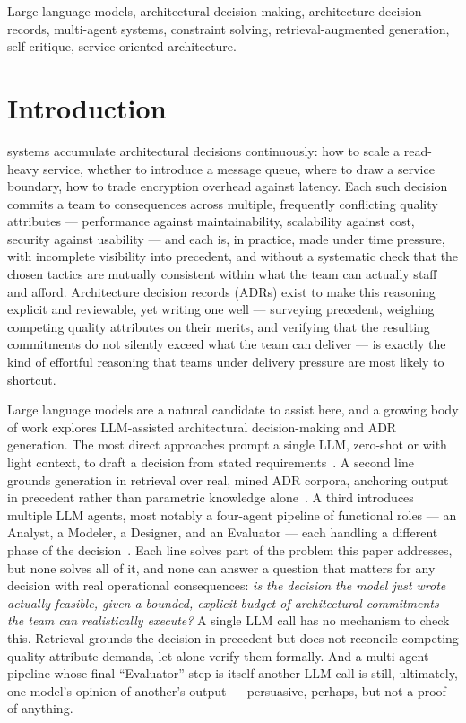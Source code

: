 \documentclass[lettersize,journal]{IEEEtran}
\begin{document}
\begin{abstract}
\end{abstract}

\begin{IEEEkeywords}
Large language models, architectural decision-making, architecture decision records, multi-agent systems, constraint solving, retrieval-augmented generation, self-critique, service-oriented architecture.
\end{IEEEkeywords}

\section{Introduction}

 systems accumulate architectural decisions continuously: how to scale a read-heavy service, whether to introduce a message queue, where to draw a service boundary, how to trade encryption overhead against latency. Each such decision commits a team to consequences across multiple, frequently conflicting quality attributes --- performance against maintainability, scalability against cost, security against usability --- and each is, in practice, made under time pressure, with incomplete visibility into precedent, and without a systematic check that the chosen tactics are mutually consistent within what the team can actually staff and afford. Architecture decision records (ADRs) exist to make this reasoning explicit and reviewable, yet writing one well --- surveying precedent, weighing competing quality attributes on their merits, and verifying that the resulting commitments do not silently exceed what the team can deliver --- is exactly the kind of effortful reasoning that teams under delivery pressure are most likely to shortcut.

Large language models are a natural candidate to assist here, and a growing body of work explores LLM-assisted architectural decision-making and ADR generation. The most direct approaches prompt a single LLM, zero-shot or with light context, to draft a decision from stated requirements~\cite{dhar2024llm}. A second line grounds generation in retrieval over real, mined ADR corpora, anchoring output in precedent rather than parametric knowledge alone~\cite{contextmatters2026}. A third introduces multiple LLM agents, most notably a four-agent pipeline of functional roles --- an Analyst, a Modeler, a Designer, and an Evaluator --- each handling a different phase of the decision~\cite{maad2025}. Each line solves part of the problem this paper addresses, but none solves all of it, and none can answer a question that matters for any decision with real operational consequences: \emph{is the decision the model just wrote actually feasible, given a bounded, explicit budget of architectural commitments the team can realistically execute?} A single LLM call has no mechanism to check this. Retrieval grounds the decision in precedent but does not reconcile competing quality-attribute demands, let alone verify them formally. And a multi-agent pipeline whose final ``Evaluator'' step is itself another LLM call is still, ultimately, one model's opinion of another's output --- persuasive, perhaps, but not a proof of anything.
\end{document}
